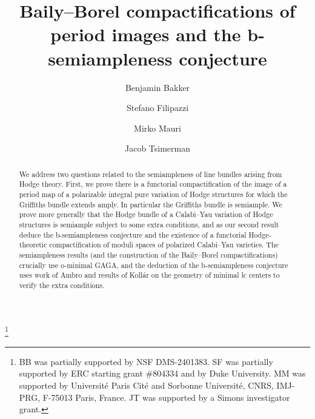 \documentclass{amsart}
\theoremstyle{definition}
\theoremstyle{remark}
\numberwithin{equation}{section}
\begin{document}
\title[Baily--Borel compactifications and  b-semiampleness]{Baily--Borel compactifications of period images and the b-semiampleness conjecture}
 \author[B. Bakker]{Benjamin Bakker}
\address{\noindent B. Bakker:  Dept. of Mathematics, Statistics, and Computer Science, University of Illinois at Chicago, Chicago, USA.}
\author[S. Filipazzi]{Stefano Filipazzi}
\address{\noindent S. Filipazzi: Department of Mathematics, Duke University,
120 Science Drive,
117 Physics Building,
Campus Box 90320,
Durham, NC 27708-0320,
USA.}
\author[M. Mauri]{Mirko Mauri}
\address{\noindent M. Mauri: Institut de Math\'ematiques 
de Jussieu-Paris Rive Gauche,
Universit\'e Paris Cit\'e,
Place Aur\'elie Nemours, 75013 Paris, France.}
\author[J. Tsimerman]{Jacob Tsimerman}
\address{\noindent J. Tsimerman:  Dept. of Mathematics, University of Toronto, Toronto, Canada.}


\begin{abstract}
We address two questions related to the semiampleness of line bundles arising from Hodge theory.  First, we prove there is a functorial compactification of the image of a period map of a polarizable integral pure variation of Hodge structures for which the Griffiths bundle extends amply.  In particular the Griffiths bundle is semiample.  We prove more generally that the Hodge bundle of a Calabi--Yau variation of Hodge structures is semiample subject to some extra conditions, and as our second result deduce the b-semiampleness conjecture and the existence of a functorial Hodge-theoretic compactification of moduli spaces of polarized Calabi--Yau varieties.
The semiampleness results (and the construction of the Baily--Borel compactifications) crucially use o-minimal GAGA, and the deduction of the  b-semiampleness conjecture uses work of Ambro and results of Koll\'ar on the geometry of minimal lc centers to verify the extra conditions.  
\end{abstract}

\thanks{
BB was partially supported by NSF DMS-2401383. SF was partially supported by ERC starting grant \#804334 and by Duke University. MM was supported by Université Paris Cité and Sorbonne Université, CNRS, IMJ-PRG, F-75013 Paris, France. JT was supported by a Simons investigator grant.
}

\maketitle
\end{document}
